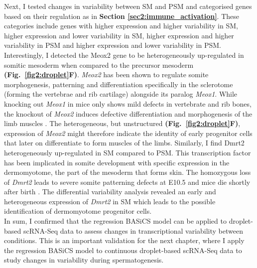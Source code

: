 Next, I tested changes in variability between SM and PSM and categorised genes based on their regulation as in \textbf{Section \ref{sec2:immune_activation}}. These categories include genes with higher expression and higher variability in SM, higher expression and lower variability in SM, higher expression and higher variability in PSM and higher expression and lower variability in PSM. Interestingly, I detected the \gls{Meox2} gene to be heterogeneously up-regulated in somitic mesoderm when compared to the precursor mesoderm \textbf{(Fig.~\ref{fig2:droplet}F)}. \textit{Meox2} has been shown to regulate somite morphogenesis, patterning and differentiation specifically in the sclerotome (forming the vertebrae and rib cartilage) alongside its paralog \textit{Meox1}. While knocking out \textit{Meox1} in mice only shows mild defects in vertebrate and rib bones, the knockout of \textit{Meox2} induces defective differentiation and morphogenesis of the limb muscles \cite{Mankoo2003}. The heterogeneous, but unstructured \textbf{(Fig.~\ref{fig2:droplet}F)}, expression of \textit{Meox2} might therefore indicate the identity of early progenitor cells that later on differentiate to form  muscles of the limbs. Similarly, I find \gls{Dmrt2} heterogeneously up-regulated in SM compared to PSM. This transcription factor has been implicated in somite development with specific expression in the dermomyotome, the part of the mesoderm that forms skin. The homozygous loss of \textit{Dmrt2} leads to severe somite patterning defects at E10.5 and mice die shortly after birth \citep{Seo2006}. The differential variability analysis revealed an early and heterogeneous expression of \textit{Dmrt2} in SM which leads to the possible identification of dermomyotome progenitor cells.\\

In sum, I confirmed that the regression BASiCS model can be applied to droplet-based scRNA-Seq data to assess changes in transcriptional variability between conditions. This is an important validation for the next chapter, where I apply the regression BASiCS model to continuous droplet-based scRNA-Seq data to study changes in variability during spermatogenesis. 

